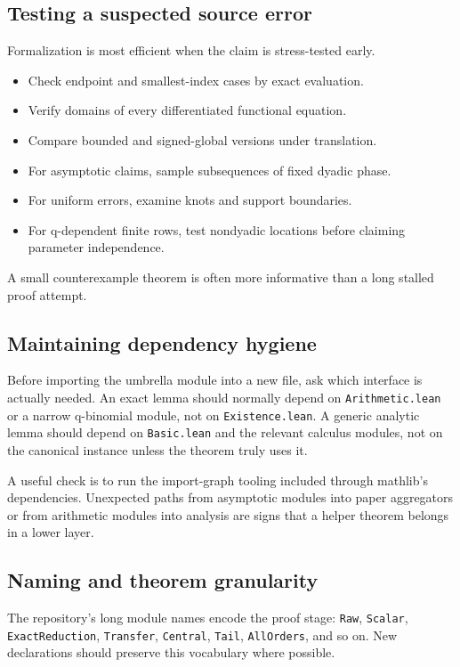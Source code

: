 \documentclass[11pt,oneside]{article}
\theoremstyle{definition}
\theoremstyle{remark}
\begin{document}
\subsection{Testing a suspected source error}
Formalization is most efficient when the claim is stress-tested early.
\begin{itemize}
  \item Check endpoint and smallest-index cases by exact evaluation.
  \item Verify domains of every differentiated functional equation.
  \item Compare bounded and signed-global versions under translation.
  \item For asymptotic claims, sample subsequences of fixed dyadic phase.
  \item For uniform errors, examine knots and support boundaries.
  \item For q-dependent finite rows, test nondyadic locations before claiming parameter independence.
\end{itemize}
A small counterexample theorem is often more informative than a long stalled proof attempt.

\subsection{Maintaining dependency hygiene}
Before importing the umbrella module into a new file, ask which interface is actually needed.  An exact lemma should normally depend on \nolinkurl{Arithmetic.lean} or a narrow q-binomial module, not on \nolinkurl{Existence.lean}.  A generic analytic lemma should depend on \nolinkurl{Basic.lean} and the relevant calculus modules, not on the canonical instance unless the theorem truly uses it.

A useful check is to run the import-graph tooling included through mathlib's dependencies.  Unexpected paths from asymptotic modules into paper aggregators or from arithmetic modules into analysis are signs that a helper theorem belongs in a lower layer.

\subsection{Naming and theorem granularity}
The repository's long module names encode the proof stage: \nolinkurl{Raw}, \nolinkurl{Scalar}, \nolinkurl{ExactReduction}, \nolinkurl{Transfer}, \nolinkurl{Central}, \nolinkurl{Tail}, \nolinkurl{AllOrders}, and so on.  New declarations should preserve this vocabulary where possible.
\end{document}
